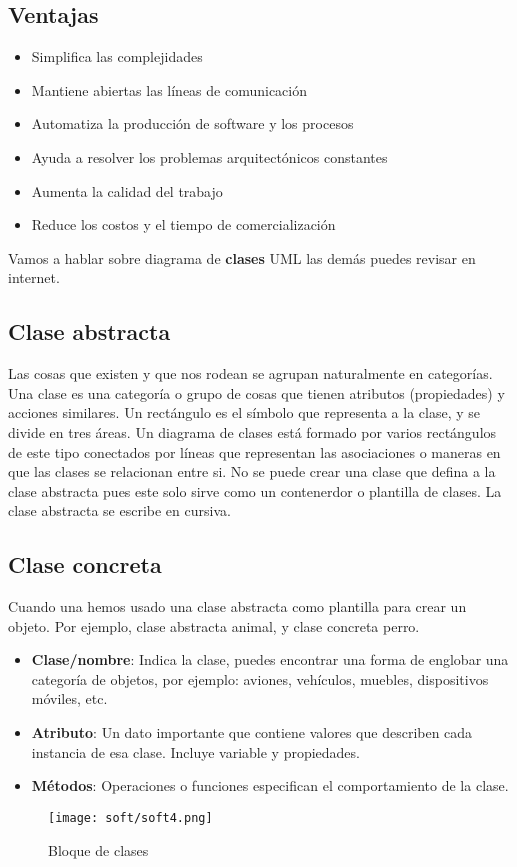 \documentclass[
	12pt, %
	fleqn, %
	a4paper, %
	oneside, %
]{LegrandOrangeBook}
\begin{document}
\subsection*{Ventajas}
\begin{itemize}
\item Simplifica las complejidades 
\item Mantiene abiertas las líneas de comunicación 
\item Automatiza la producción de software y los procesos  
\item Ayuda a resolver los problemas arquitectónicos constantes 
\item Aumenta la calidad del trabajo 
\item Reduce los costos y el tiempo de comercialización 
\end{itemize}
Vamos a hablar sobre diagrama de \textbf{clases} UML las demás puedes revisar en internet.
\subsection{Clase abstracta}
Las cosas que existen y que nos rodean se agrupan naturalmente en categorías. Una clase es una categoría o grupo de cosas que tienen atributos (propiedades) y acciones similares. Un rectángulo es el símbolo que representa a la clase, y se divide en tres áreas. Un diagrama de clases está formado por varios rectángulos de este tipo conectados por líneas que representan las asociaciones o maneras en que las clases se relacionan entre si. No se puede crear una clase que defina a la clase abstracta pues este solo sirve como un contenerdor o plantilla de clases. La clase abstracta se escribe en cursiva.
\subsection{Clase concreta}
Cuando una hemos usado una clase abstracta como plantilla para crear un objeto. Por ejemplo, clase abstracta animal, y clase concreta perro.
\begin{itemize}
\item \textbf{Clase/nombre}: Indica la clase, puedes encontrar una forma de englobar una categoría de objetos, por ejemplo: aviones, vehículos, muebles, dispositivos móviles, etc.
\item \textbf{Atributo}: Un dato importante que contiene valores que describen cada instancia de esa clase. Incluye variable y propiedades.
\item \textbf{Métodos}: Operaciones o funciones especifican el comportamiento de la clase.
\end{itemize}
\begin{figure}[H]
\centering
\texttt{[image: soft/soft4.png]}
\caption{Bloque de clases}
\end{figure}
\end{document}
